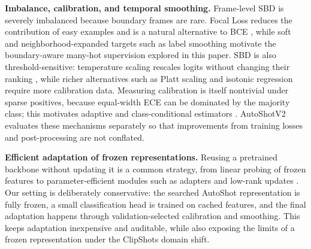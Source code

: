 \textbf{Imbalance, calibration, and temporal smoothing.} Frame-level SBD is
severely imbalanced because boundary frames are rare. Focal Loss reduces
the contribution of easy examples and is a natural alternative to BCE
\cite{lin2017focal}, while soft and neighborhood-expanded targets such as
label smoothing \cite{muller2019label} motivate the boundary-aware many-hot
supervision explored in this paper. SBD is also threshold-sensitive:
temperature scaling rescales logits without changing their ranking
\cite{guo2017calibration}, while richer alternatives such as Platt scaling
\cite{platt1999probabilistic} and isotonic regression
\cite{zadrozny2002transforming} require more calibration data. Measuring
calibration is itself nontrivial under sparse positives, because
equal-width ECE can be dominated by the majority class; this motivates
adaptive and class-conditional estimators \cite{nixon2019measuring}.
AutoShotV2 evaluates these mechanisms separately so that improvements from
training losses and post-processing are not conflated.

\textbf{Efficient adaptation of frozen representations.} Reusing a
pretrained backbone without updating it is a common strategy, from linear
probing of frozen features to parameter-efficient modules such as adapters
\cite{houlsby2019parameter} and low-rank updates \cite{hu2022lora}. Our
setting is deliberately conservative: the searched AutoShot representation
is fully frozen, a small classification head is trained on cached features,
and the final adaptation happens through validation-selected calibration
and smoothing. This keeps adaptation inexpensive and auditable, while also
exposing the limits of a frozen representation under the ClipShots domain
shift.
